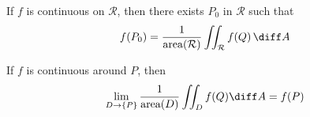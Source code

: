 \begin{frame}
\begin{theorem}
If $f$ is continuous on $\mathcal{R}$, then there exists $P_0$ in $\mathcal{R}$ such that
\[
f(P_0) = \frac{1}{\text{area}(\mathcal{R})} \iint_{\mathcal R} f(Q) \,\diff A
\]
\end{theorem}
\begin{theorem}
If $f$ is continuous around $P$, then
\[
\lim_{D \to \{ P \} } \frac{1}{\text{area}(D)} \iint_D f(Q) \diff A = f(P)
\]
\end{theorem}
\end{frame}